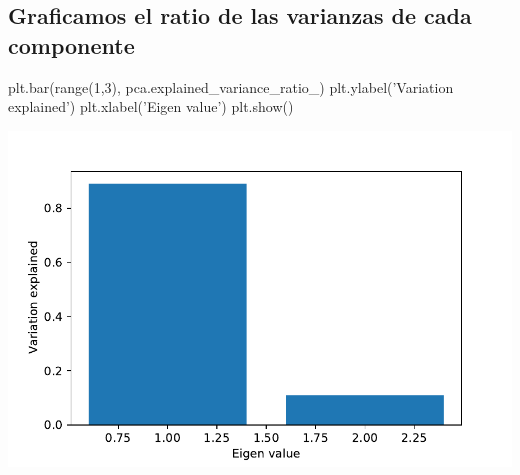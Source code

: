 \subsection{Graficamos el ratio de las varianzas de cada componente}
\begin{jupyter}{8}
plt.bar(range(1,3), pca.explained_variance_ratio_)
plt.ylabel('Variation explained')
plt.xlabel('Eigen value')
plt.show()
\end{jupyter}
\begin{center}
\includegraphics[scale=0.75]{media/profesores/barras.pdf}
\end{center}


